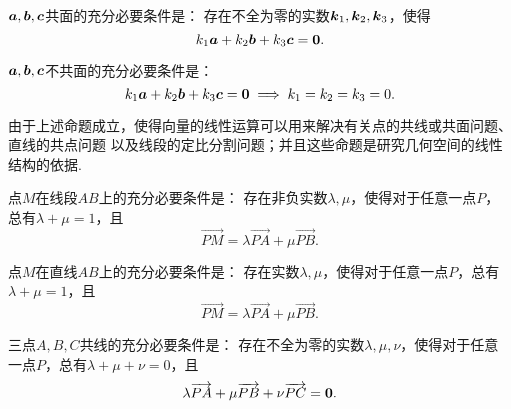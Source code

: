 \begin{theorem}\label{theorem:解析几何.三向量共面的充分必要条件1}
\(\boldsymbol{a},\boldsymbol{b},\boldsymbol{c}\)共面的充分必要条件是：
存在不全为零的实数\(\boldsymbol{k}_1,\boldsymbol{k}_2,\boldsymbol{k}_3\)，使得\begin{equation*}
	k_1 \boldsymbol{a} + k_2 \boldsymbol{b} + k_3 \boldsymbol{c} = \boldsymbol{0}.
\end{equation*}
\end{theorem}

\begin{corollary}\label{theorem:解析几何.三向量不共面的充分必要条件1}
\(\boldsymbol{a},\boldsymbol{b},\boldsymbol{c}\)不共面的充分必要条件是：\begin{equation*}
	k_1 \boldsymbol{a} + k_2 \boldsymbol{b} + k_3 \boldsymbol{c} = \boldsymbol{0}
	\implies
	k_1 = k_2 = k_3 = 0.
\end{equation*}
\end{corollary}

由于上述命题成立，使得向量的线性运算可以用来解决有关点的共线或共面问题、直线的共点问题
以及线段的定比分割问题；并且这些命题是研究几何空间的线性结构的依据.

\begin{theorem}\label{theorem:解析几何.点在线段上的充分必要条件1}
点\(M\)在线段\(AB\)上的充分必要条件是：
存在非负实数\(\lambda,\mu\)，使得对于任意一点\(P\)，总有\(\lambda+\mu=1\)，且\begin{equation*}
	\vec{PM} = \lambda \vec{PA} + \mu \vec{PB}.
\end{equation*}
\end{theorem}

\begin{theorem}\label{theorem:解析几何.点在直线上的充分必要条件1}
点\(M\)在直线\(AB\)上的充分必要条件是：
存在实数\(\lambda,\mu\)，使得对于任意一点\(P\)，总有\(\lambda+\mu=1\)，且\begin{equation*}
	\vec{PM} = \lambda \vec{PA} + \mu \vec{PB}.
\end{equation*}
\end{theorem}

\begin{theorem}\label{theorem:解析几何.三点共线的充分必要条件1}
三点\(A,B,C\)共线的充分必要条件是：
存在不全为零的实数\(\lambda,\mu,\nu\)，使得对于任意一点\(P\)，总有\(\lambda+\mu+\nu=0\)，且\begin{equation*}
	\lambda \overrightarrow{PA} + \mu \overrightarrow{PB} + \nu \overrightarrow{PC} = \boldsymbol{0}.
\end{equation*}
\end{theorem}

